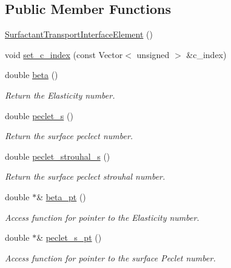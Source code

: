 \subsection*{Public Member Functions}
\begin{DoxyCompactItemize}
\item 
\hyperlink{classoomph_1_1SurfactantTransportInterfaceElement_a8934ab8e723427ed39298c592b2876a5}{Surfactant\+Transport\+Interface\+Element} ()
\item 
void \hyperlink{classoomph_1_1SurfactantTransportInterfaceElement_aaf7988dfac3e02018c591f2f9e34f644}{set\+\_\+c\+\_\+index} (const Vector$<$ unsigned $>$ \&c\+\_\+index)
\item 
double \hyperlink{classoomph_1_1SurfactantTransportInterfaceElement_a79003d87401ad6106b8d10373ff12e73}{beta} ()
\begin{DoxyCompactList}\small\item\em Return the Elasticity number. \end{DoxyCompactList}\item 
double \hyperlink{classoomph_1_1SurfactantTransportInterfaceElement_ac945c28401b92a061e3e245e83541c55}{peclet\+\_\+s} ()
\begin{DoxyCompactList}\small\item\em Return the surface peclect number. \end{DoxyCompactList}\item 
double \hyperlink{classoomph_1_1SurfactantTransportInterfaceElement_acb4ff16ed90e79ffe9e4156ef030d689}{peclet\+\_\+strouhal\+\_\+s} ()
\begin{DoxyCompactList}\small\item\em Return the surface peclect strouhal number. \end{DoxyCompactList}\item 
double $\ast$\& \hyperlink{classoomph_1_1SurfactantTransportInterfaceElement_a7f64f64c3b5ad3abe6e09bb10a039298}{beta\+\_\+pt} ()
\begin{DoxyCompactList}\small\item\em Access function for pointer to the Elasticity number. \end{DoxyCompactList}\item 
double $\ast$\& \hyperlink{classoomph_1_1SurfactantTransportInterfaceElement_a3ce30a3705a18034585c80d2f9757099}{peclet\+\_\+s\+\_\+pt} ()
\begin{DoxyCompactList}\small\item\em Access function for pointer to the surface Peclet number. \end{DoxyCompactList}\item 

\end{DoxyCompactItemize}
